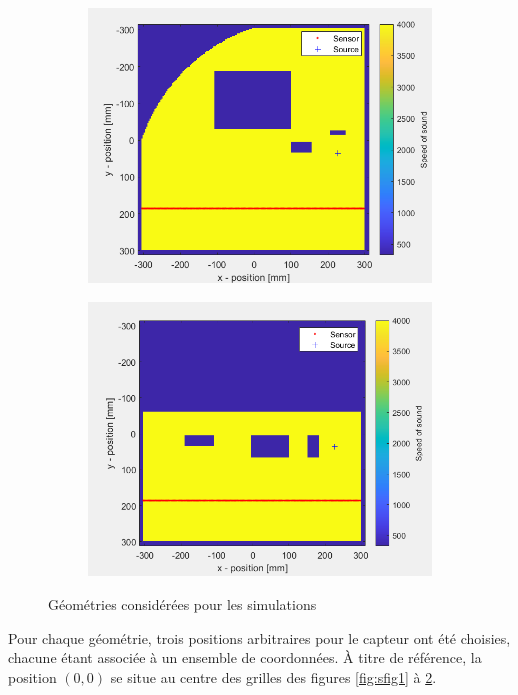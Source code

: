 \documentclass[conference]{IEEEtran}
\begin{document}
\begin{figure}[H]
\begin{subfigure}{.155\textwidth}
    \includegraphics[width=.95\linewidth]{forme5.png}
    \caption{}
    \label{fig:sfig5}
  \end{subfigure}
  \begin{subfigure}{.155\textwidth}
    \centering
    \includegraphics[width=.95\linewidth]{forme6.png}
    \caption{}
    \label{fig:sfig6}
  \end{subfigure}
  \caption{Géométries considérées pour les simulations}
  \label{fig:fig}
\end{figure}
Pour chaque géométrie, trois positions arbitraires pour le capteur ont été choisies,
chacune étant associée à un ensemble de coordonnées. À titre de référence, la position $(0,0)$ se situe 
au centre des grilles des figures \ref{fig:sfig1} à \ref{fig:sfig6}.  %
\end{document}
